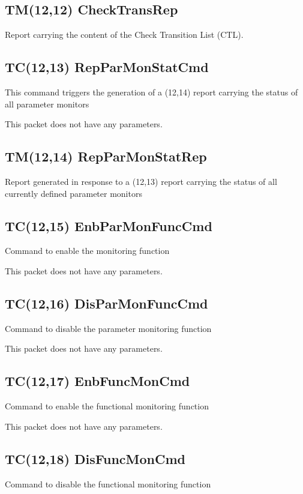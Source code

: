 \pagebreak
\subsection{TM(12,12) CheckTransRep}
Report carrying the content of the Check Transition List (CTL).

\pagebreak
\subsection{TC(12,13) RepParMonStatCmd}
This command triggers the generation of a (12,14) report carrying the status of all parameter monitors

This packet does not have any parameters.

\pagebreak
\subsection{TM(12,14) RepParMonStatRep}
Report generated in response to a (12,13) report carrying the status of all currently defined parameter monitors

\pagebreak
\subsection{TC(12,15) EnbParMonFuncCmd}
Command to enable the monitoring function

This packet does not have any parameters.

\pagebreak
\subsection{TC(12,16) DisParMonFuncCmd}
Command to disable the parameter monitoring function

This packet does not have any parameters.

\pagebreak
\subsection{TC(12,17) EnbFuncMonCmd}
Command to enable the functional monitoring function

This packet does not have any parameters.

\pagebreak
\subsection{TC(12,18) DisFuncMonCmd}
Command to disable the functional monitoring function

